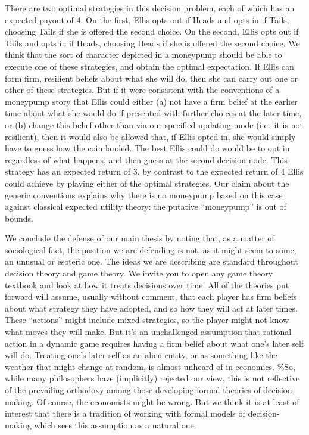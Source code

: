 \documentclass[
  11pt,
  letterpaper,
  DIV=11,
  numbers=noendperiod,
  twoside]{scrartcl}
\begin{document}
There are two optimal strategies in this decision problem, each of which
has an expected payout of 4. On the first, Ellis opts out if Heads and
opts in if Tails, choosing Tails if she is offered the second choice. On
the second, Ellis opts out if Tails and opts in if Heads, choosing Heads
if she is offered the second choice. We think that the sort of character
depicted in a moneypump should be able to execute one of these
strategies, and obtain the optimal expectation. If Ellis can form firm,
resilient beliefs about what she will do, then she can carry out one or
other of these strategies. But if it were consistent with the
conventions of a moneypump story that Ellis could either (a) not have a
firm belief at the earlier time about what she would do if presented
with further choices at the later time, or (b) change this belief other
than via our specified updating mode (i.e.~it is not resilient), then it
would also be allowed that, if Ellis opted in, she would simply have to
guess how the coin landed. The best Ellis could do would be to opt in
regardless of what happens, and then guess at the second decision node.
This strategy has an expected return of 3, by contrast to the expected
return of 4 Ellis could achieve by playing either of the optimal
strategies. Our claim about the generic conventions explains why there
is no moneypump based on this case against classical expected utility
theory: the putative ``moneypump'' is out of bounds.

We conclude the defense of our main thesis by noting that, as a matter
of sociological fact, the position we are defending is not, as it might
seem to some, an unusual or esoteric one. The ideas we are describing
are standard throughout decision theory and game theory. We invite you
to open any game theory textbook and look at how it treats decisions
over time. All of the theories put forward will assume, usually without
comment, that each player has firm beliefs about what strategy they have
adopted, and so how they will act at later times. These ``actions''
might include mixed strategies, so the player might not know what moves
they will make. But it's an unchallenged assumption that rational action
in a dynamic game requires having a firm belief about what one's later
self will do. Treating one's later self as an alien entity, or as
something like the weather that might change at random, is almost
unheard of in economics. \%So, while many philosophers have (implicitly)
rejected our view, this is not reflective of the prevailing orthodoxy
among those developing formal theories of decision-making. Of course,
the economists might be wrong. But we think it is at least of interest
that there is a tradition of working with formal models of
decision-making which sees this assumption as a natural one.
\end{document}
